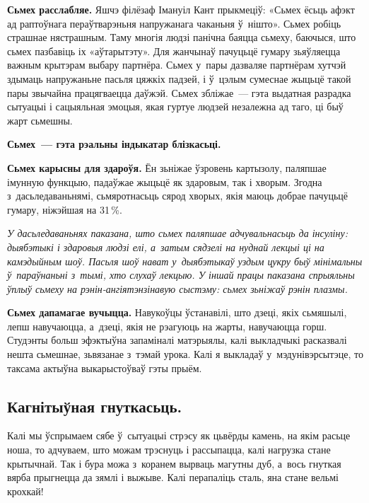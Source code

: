 \textbf{Сьмех расслабляе.} Яшчэ філёзаф Імануіл Кант прыкмеціў: «Сьмех ёсьць афэкт ад раптоўнага пераўтварэньня напружанага чаканьня ў~нішто». Сьмех робіць страшнае нястрашным. Таму многія людзі панічна баяцца сьмеху, баючыся, што сьмех пазбавіць іх «аўтарытэту». Для жанчынаў пачуцьцё гумару зьяўляецца важным крытэрам выбару партнёра. Сьмех у~пары дазваляе партнёрам хутчэй здымаць напружаньне пасьля цяжкіх падзей, і ў~цэлым сумеснае жыцьцё такой пары звычайна працягваецца даўжэй. Сьмех збліжае~--- гэта выдатная разрадка сытуацыі і сацыяльная эмоцыя, якая гуртуе людзей незалежна ад таго, ці быў жарт сьмешны. 

\textbf{Сьмех~--- гэта рэальны індыкатар блізкасьці.}

\textbf{Сьмех карысны для здароўя.} Ён зьніжае ўзровень картызолу, паляпшае імунную функцыю, падаўжае жыцьцё як здаровым, так і хворым. Згодна з~дасьледаваньнямі, сьмяротнасьць сярод хворых, якія маюць добрае пачуцьцё гумару, ніжэйшая на 31\,\%. 

\emph{У дасьледаваньнях паказана, што сьмех паляпшае адчувальнасьць да інсуліну: дыябэтыкі і здаровыя людзі елі, а~затым сядзелі на нуднай лекцыі ці на камэдыйным шоў. Пасьля шоў нават у~дыябэтыкаў уздым цукру быў мінімальны ў~параўнаньні з~тымі, хто слухаў лекцыю. У іншай працы паказана спрыяльны ўплыў сьмеху на рэнін-ангіятэнзінавую сыстэму: сьмех зьніжаў рэнін плазмы.}


\textbf{Сьмех дапамагае вучыцца.} Навукоўцы ўстанавілі, што дзеці, якіх сьмяшылі, лепш навучаюцца, а~дзеці, якія не рэагуюць на жарты, навучаюцца горш. Студэнты больш эфэктыўна запаміналі матэрыялы, калі выкладчыкі расказвалі нешта сьмешнае, зьвязанае з~тэмай урока. Калі я выкладаў у~мэдунівэрсытэце, то таксама актыўна выкарыстоўваў гэты прыём.

\subsection*{Кагнітыўная гнуткасьць.}

Калі мы ўспрымаем сябе ў~сытуацыі стрэсу як цьвёрды камень, на якім расьце ноша, то адчуваем, што можам трэснуць і рассыпацца, калі нагрузка стане крытычнай. Так і бура можа з~коранем вырваць магутны дуб, а~вось гнуткая вярба прыгнецца да зямлі і выжыве. Калі перапаліць сталь, яна стане вельмі крохкай!

